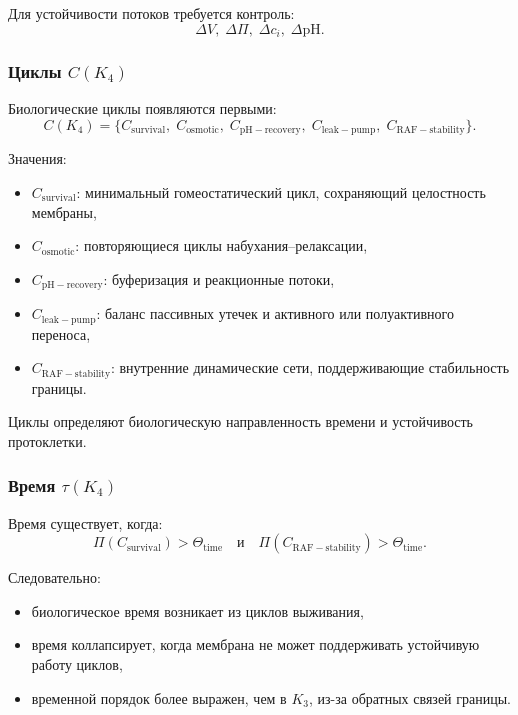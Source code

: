 Для устойчивости потоков требуется контроль:
\[
\Delta V,\; \Delta \Pi,\; \Delta c_i,\; \Delta \mathrm{pH}.
\]

\subsubsection{Циклы \texorpdfstring{$C(K_4)$}{C(K_4)}}

Биологические циклы появляются первыми:
\[
C(K_4) =
\{ C_{\mathrm{survival}},\;
   C_{\mathrm{osmotic}},\;
   C_{\mathrm{pH-recovery}},\;
   C_{\mathrm{leak-pump}},\;
   C_{\mathrm{RAF-stability}} \}.
\]

Значения:
\begin{itemize}
    \item $C_{\mathrm{survival}}$: минимальный гомеостатический цикл, сохраняющий
          целостность мембраны,
    \item $C_{\mathrm{osmotic}}$: повторяющиеся циклы набухания–релаксации,
    \item $C_{\mathrm{pH-recovery}}$: буферизация и реакционные потоки,
    \item $C_{\mathrm{leak-pump}}$: баланс пассивных утечек и активного
          или полуактивного переноса,
    \item $C_{\mathrm{RAF-stability}}$: внутренние динамические сети,
          поддерживающие стабильность границы.
\end{itemize}

Циклы определяют биологическую направленность времени и устойчивость
протоклетки.

\subsubsection{Время \texorpdfstring{$\tau(K_4)$}{\tau(K_4)}}

Время существует, когда:
\[
\Pi(C_{\mathrm{survival}}) > \Theta_{\mathrm{time}}
\quad\text{и}\quad
\Pi(C_{\mathrm{RAF-stability}}) > \Theta_{\mathrm{time}}.
\]

Следовательно:
\begin{itemize}
    \item биологическое время возникает из циклов выживания,
    \item время коллапсирует, когда мембрана не может поддерживать
          устойчивую работу циклов,
    \item временной порядок более выражен, чем в $K_3$, из-за обратных связей
          границы.
\end{itemize}

